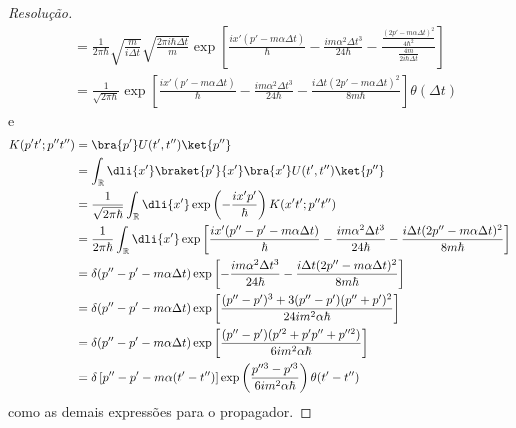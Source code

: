 \begin{proof}[Resolução]
\begin{align*}
                      &= \frac1{2 \pi \hbar}\sqrt{\frac{m}{i \Delta t}} \sqrt{\frac{2 \pi i \hbar \Delta t}{m}}\exp\left[\frac{i x' (p' - m \alpha \Delta t)}{\hbar} - \frac{i m \alpha^2 \Delta t^3}{24 \hbar} - \frac{\frac{(2p' - m \alpha \Delta t)^2}{4 \hbar^2}}{\frac{4m}{2i \hbar \Delta t}}\right]\\
                      &= \frac1{\sqrt{2 \pi \hbar}}\exp\left[\frac{i x' (p' - m \alpha \Delta t)}{\hbar} - \frac{i m \alpha^2 \Delta t^3}{24 \hbar} - \frac{i \Delta t(2p' - m \alpha \Delta t)^2}{8 m \hbar}\right]\theta(\Delta t)
   \end{align*}
   e
   \begin{align*}
      K(p't'; p'' t'') &= \bra{p'}U(t', t'')\ket{p''}\\
                       &= \int_{\mathbb{R}} \dli{x'} \braket{p'}{x'}\bra{x'}U(t',t'')\ket{p''}\\
                       &= \frac{1}{\sqrt{2\pi \hbar}}\int_{\mathbb{R}}\dli{x'} \exp\left(-\frac{i x' p'}{\hbar}\right)K(x't'; p'' t'')\\
                       &= \frac{1}{2\pi \hbar}\int_{\mathbb{R}}\dli{x'} \exp\left[\frac{i x' (p'' - p' - m \alpha \Delta t)}{\hbar} - \frac{i m \alpha^2 \Delta t^3}{24 \hbar} - \frac{i \Delta t(2p'' - m \alpha \Delta t)^2}{8 m \hbar}\right]\\
                       &= \delta(p'' - p' - m \alpha \Delta t) \exp\left[ - \frac{i m \alpha^2 \Delta t^3}{24 \hbar} - \frac{i \Delta t(2p'' - m \alpha \Delta t)^2}{8 m \hbar}\right]\\
                       &= \delta(p'' - p' - m \alpha \Delta t) \exp\left[\frac{(p'' - p')^3 + 3(p'' - p')(p'' + p')^2}{24i m^2 \alpha \hbar}\right]\\
                       &= \delta(p'' - p' - m \alpha \Delta t)\exp\left[\frac{(p'' - p')(p'^2 + p' p'' + p''^2)}{6i m^2 \alpha \hbar}\right]\\
                       &=  \delta\left[p'' - p' - m \alpha (t' - t'')\right]\exp\left(\frac{p''^3 - p'^3}{6i m^2 \alpha \hbar}\right) \theta(t' - t'')
   \end{align*}
   como as demais expressões para o propagador.
\end{proof}
